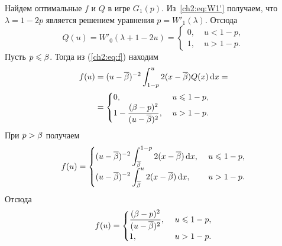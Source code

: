 {\begin{example}
  Найдем оптимальные $f$ и $Q$ в игре $G_1(p)$.
  Из~\eqref{ch2:eq:W1'} получаем, что $\lambda = 1 - 2p$ является решением уравнения $p = W'_1(\lambda)$.
  Отсюда
  \begin{equation*}
    Q(u) = W'_0(\lambda + 1 - 2u) = \begin{cases}
      0, &\; u < 1 - p,\\
      1, &\; u > 1 - p.
    \end{cases}
  \end{equation*}
  Пусть $p \leqslant \beta$.
  Тогда из (\ref{ch2:eq:f}) находим
  \begin{align*}
    f(u) 
    &=
      (u - {\overline{\beta}})^{-2} \int_{1-p}^u 2 (x - {\overline{\beta}}) Q(x) \mathop{}\!\mathrm{d} x = \\
    &=
      \begin{cases}
        0, &\; u \leqslant 1 - p,\\
        1 - {\displaystyle \frac{(\beta - p)^2}{(u-{\overline{\beta}})^2}}, &\; u > 1 - p.
      \end{cases}
  \end{align*}
  При $p > \beta$ получаем
  \begin{equation*}
    f(u)= \begin{cases}
      {\displaystyle (u-\DCo)^{-2} \int_\DCo^{1-p} 2 (x - \DCo) \di x},\ & u \leq 1 - p,\\
      {\displaystyle (u - \DCo)^{-2} \int_\DCo^u 2 (x - \DCo) \di x},\ & u > 1 - p.
    \end{cases}                                                     
  \end{equation*}
  Отсюда
  \begin{equation*}
    f(u) = \begin{cases}
      {\displaystyle \frac{(\ensuremath{\beta}- p)^2}{(u - \ensuremath{{\overline{\beta}}})^2}},\ & u \leqslant 1 - p,\\
      1,\ & u > 1 - p.
    \end{cases}  
  \end{equation*}
\end{example}

}

